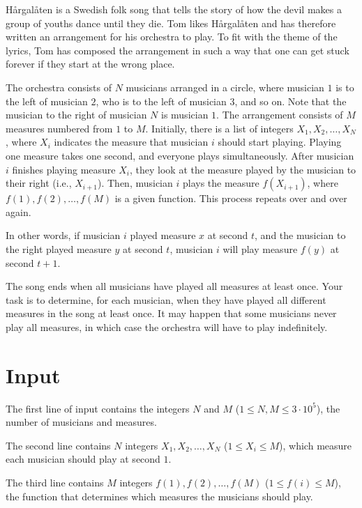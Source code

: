 
\noindent
Hårgalåten is a Swedish folk song that tells the story of how the devil makes a group of youths dance until they die.
Tom likes Hårgalåten and has therefore written an arrangement for his orchestra to play.
To fit with the theme of the lyrics, Tom has composed the arrangement in such a way that one can get stuck
forever if they start at the wrong place.

The orchestra consists of $N$ musicians arranged in a circle, where musician $1$ is to the left of musician $2$,
who is to the left of musician $3$, and so on. Note that the musician to the right of musician $N$
is musician $1$. The arrangement consists of $M$ measures numbered from $1$ to $M$.
Initially, there is a list of integers $X_1, X_2, \dots, X_N$, where $X_i$ indicates the measure that musician $i$
should start playing. Playing one measure takes one second, and everyone plays simultaneously. After musician $i$
finishes playing measure $X_i$, they look at the measure played by the musician to their right (i.e., $X_{i+1}$).
Then, musician $i$ plays the measure $f(X_{i+1})$, where $f(1), f(2), \dots, f(M)$ is a given function. This process
repeats over and over again.

In other words, if musician $i$ played measure $x$ at second $t$, and the musician to the right played measure $y$
at second $t$, musician $i$ will play measure $f(y)$ at second $t+1$. 

The song ends when all musicians have played all measures at least once. Your task is to determine, for each musician,
when they have played all different measures in the song at least once. It may happen that some musicians never play
all measures, in which case the orchestra will have to play indefinitely.

\section*{Input}
The first line of input contains the integers $N$ and $M$ ($1 \leq N,M \leq 3 \cdot 10^5$), the number of
musicians and measures.

The second line contains $N$ integers $X_1, X_2, \dots, X_N$ ($1 \leq X_i \leq M$), which measure each musician
should play at second $1$.

The third line contains $M$ integers $f(1), f(2), \dots, f(M)$ ($1 \leq f(i) \leq M$), the function that determines
which measures the musicians should play.

